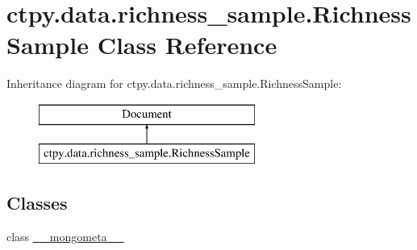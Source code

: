 \hypertarget{classctpy_1_1data_1_1richness__sample_1_1_richness_sample}{\section{ctpy.\-data.\-richness\-\_\-sample.\-Richness\-Sample Class Reference}
\label{classctpy_1_1data_1_1richness__sample_1_1_richness_sample}
}
Inheritance diagram for ctpy.\-data.\-richness\-\_\-sample.\-Richness\-Sample\-:\begin{figure}[H]
\begin{center}
\leavevmode
\includegraphics[height=2.000000cm]{classctpy_1_1data_1_1richness__sample_1_1_richness_sample}
\end{center}
\end{figure}
\subsection*{Classes}
\begin{DoxyCompactItemize}
\item 
class \hyperlink{classctpy_1_1data_1_1richness__sample_1_1_richness_sample_1_1____mongometa____}{\-\_\-\-\_\-mongometa\-\_\-\-\_\-}
\end{DoxyCompactItemize}
